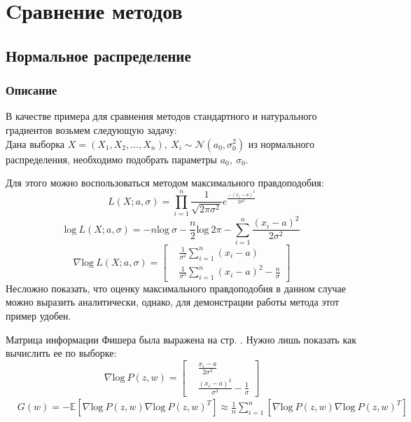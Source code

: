 \documentclass[a4paper,12pt]{article}
\begin{document}
\section{Cравнение методов}
\subsection{Нормальное распределение}
\subsubsection{Описание}
        В качестве примера для сравнения методов стандартного и натурального градиентов возьмем следующую задачу: \\ 
        Дана выборка $X = (X_1, X_2, ..., X_n), ~ X_i \sim \mathcal{N}(a_0, \sigma^2_0)$ из нормального распределения, необходимо подобрать параметры $a_0, ~ \sigma_0$.

        Для этого можно воспользоваться методом максимального правдоподобия:
        $$L(X; a, \sigma) = \prod_{i=1}^n \frac{1}{\sqrt{2\pi\sigma^2}}e^{\frac{-(x_i-a)^2}{2\sigma^2}}$$
        $$\mbox{log} ~ L(X; a, \sigma) = -n \mbox{log} ~ \sigma - \frac{n}{2} \mbox{log} ~ 2\pi - \sum_{i=1}^n \frac{(x_i-a)^2}{2\sigma^2}$$
        $$
            \nabla \mbox{log} ~ L(X; a, \sigma) = 
            \left[
                \begin{aligned}
                    & \frac{1}{\sigma^2}\sum_{i=1}^n (x_i - a) \\
                    & \frac{1}{\sigma^3}\sum_{i=1}^n (x_i - a)^2 - \frac{n}{\sigma}
                \end{aligned}
            \right]
        $$
        Несложно показать, что оценку максимального правдоподобия в данном случае можно выразить аналитически, однако, для демонстрации работы метода этот пример удобен.

        Матрица информации Фишера была выражена на стр. \pageref{FisherMatrix}.
        Нужно лишь показать как вычислить ее по выборке:
        $$
            \nabla \mbox{log} ~ P(z, w) = 
            \left[
                \begin{aligned}
                    & \frac{x_i - a}{2\sigma^2} \\
                    & \frac{(x_i - a)^2}{\sigma^3} - \frac{1}{\sigma}
                \end{aligned}
            \right]
        $$
        $$
            \begin{aligned}
                & G(w) = \mathbb{-E} \left[ \nabla \mbox{log} ~ P(z, w) \nabla \mbox{log} ~ P(z, w)^T \right] 
                \approx \frac{1}{n}\sum_{i=1}^n \left[ \nabla \mbox{log} ~ P(z, w) \nabla \mbox{log} ~ P(z, w)^T \right] \\
            \end{aligned}
        $$
\end{document}
